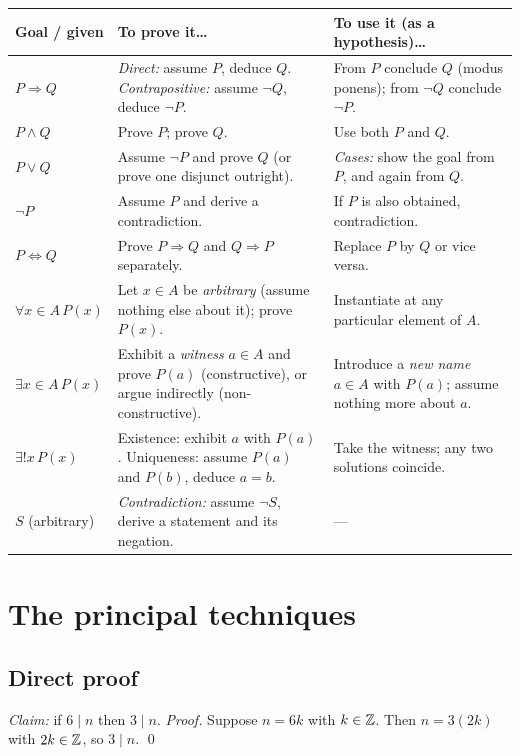 \begin{center}
	\begin{tabular}{@{}p{2.6cm}p{6.2cm}p{5.8cm}@{}}
		\toprule
		\textbf{Goal / given} & \textbf{To prove it}\ldots & \textbf{To use it (as a hypothesis)}\ldots\\
		\midrule
		$P\Rightarrow Q$ & \emph{Direct:} assume $P$, deduce $Q$. \emph{Contrapositive:} assume $\neg Q$, deduce $\neg P$. & From $P$ conclude $Q$ (modus ponens); from $\neg Q$ conclude $\neg P$.\\
		$P\wedge Q$ & Prove $P$; prove $Q$. & Use both $P$ and $Q$.\\
		$P\vee Q$ & Assume $\neg P$ and prove $Q$ (or prove one disjunct outright). & \emph{Cases:} show the goal from $P$, and again from $Q$.\\
		$\neg P$ & Assume $P$ and derive a contradiction. & If $P$ is also obtained, contradiction.\\
		$P\Leftrightarrow Q$ & Prove $P\Rightarrow Q$ and $Q\Rightarrow P$ separately. & Replace $P$ by $Q$ or vice versa.\\
		$\forall x\in A\,P(x)$ & Let $x\in A$ be \emph{arbitrary} (assume nothing else about it); prove $P(x)$. & Instantiate at any particular element of $A$.\\
		$\exists x\in A\,P(x)$ & Exhibit a \emph{witness} $a\in A$ and prove $P(a)$ (constructive), or argue indirectly (non-constructive). & Introduce a \emph{new name} $a\in A$ with $P(a)$; assume nothing more about $a$.\\
		$\exists!x\,P(x)$ & Existence: exhibit $a$ with $P(a)$. Uniqueness: assume $P(a)$ and $P(b)$, deduce $a=b$. & Take the witness; any two solutions coincide.\\
		$S$ (arbitrary) & \emph{Contradiction:} assume $\neg S$, derive a statement and its negation. & ---\\
		\bottomrule
	\end{tabular}
\end{center}

\section{The principal techniques}

\subsection{Direct proof}
\begin{example}
	\textit{Claim:} if $6\mid n$ then $3\mid n$. \emph{Proof.} Suppose $n=6k$ with $k\in\mathbb{Z}$. Then $n=3(2k)$ with $2k\in\mathbb{Z}$, so $3\mid n$. \qed
\end{example}

